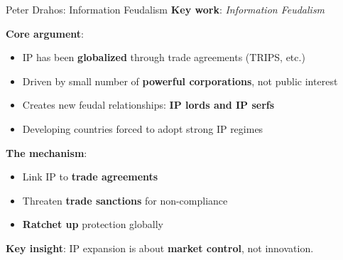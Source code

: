 ﻿\documentclass[aspectratio=169,11pt]{beamer}
\begin{document}
\begin{frame}{Peter Drahos: Information Feudalism}
\textbf{Key work}: \textit{Information Feudalism} \parencite{drahos_information_feudalism}

\vspace{0.2cm}
\textbf{Core argument}:
\begin{itemize}
    \item IP has been \textbf{globalized} through trade agreements (TRIPS, etc.)
    \item Driven by small number of \textbf{powerful corporations}, not public interest
    \item Creates new feudal relationships: \textbf{IP lords and IP serfs}
    \item Developing countries forced to adopt strong IP regimes
\end{itemize}

\vspace{0.3cm}
\textbf{The mechanism}:
\begin{itemize}
    \item Link IP to \textbf{trade agreements}
    \item Threaten \textbf{trade sanctions} for non-compliance
    \item \textbf{Ratchet up} protection globally
\end{itemize}

\vspace{0.2cm}
\textbf{Key insight}: IP expansion is about \textbf{market control}, not innovation.
\end{frame}
\end{document}
